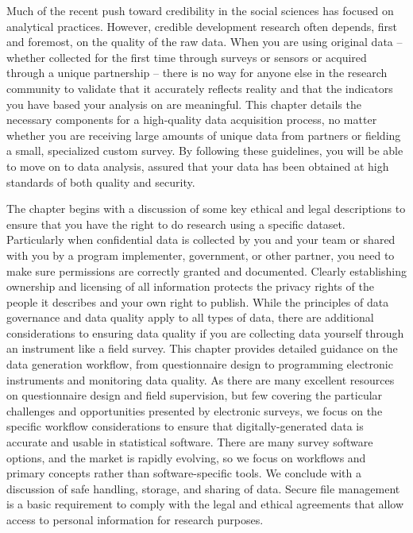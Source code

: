 
\begin{fullwidth}
Much of the recent push toward credibility in the social sciences has focused on analytical practices.
However, credible development research often depends, first and foremost, on the quality of the raw data.
When you are using original data -- whether collected for the first time through surveys or sensors or acquired through a unique partnership --
there is no way for anyone else in the research community to validate that it accurately reflects reality
and that the indicators you have based your analysis on are meaningful.
This chapter details the necessary components for a high-quality data acquisition process,
no matter whether you are receiving large amounts of unique data from partners
or fielding a small, specialized custom survey. By following these guidelines, you will be able to move on to data analysis,
assured that your data has been obtained at high standards of both quality and security.

The chapter begins with a discussion of some key ethical and legal descriptions
to ensure that you have the right to do research using a specific dataset.
Particularly when confidential data is collected by you and your team
or shared with you by a program implementer, government, or other partner,
you need to make sure permissions are correctly granted and documented.
Clearly establishing ownership and licensing of all information protects 
the privacy rights of the people it describes and your own right to publish.
While the principles of data governance and data quality apply to all types of data,
there are additional considerations to ensuring data quality if you are
collecting data yourself through an instrument like a field survey.
This chapter provides detailed guidance on the data generation workflow,
from questionnaire design to programming electronic instruments and monitoring data quality.
As there are many excellent resources on questionnaire design and field supervision,
but few covering the particular challenges and opportunities presented by electronic surveys,
we focus on the specific workflow considerations to ensure that 
digitally-generated data is accurate and usable in statistical software.
There are many survey software options, and the market is rapidly evolving,
so we focus on workflows and primary concepts rather than software-specific tools.
We conclude with a discussion of safe handling, storage, and sharing of data.
Secure file management is a basic requirement
to comply with the legal and ethical agreements that allow
 access to personal information for research purposes.


\end{fullwidth}

